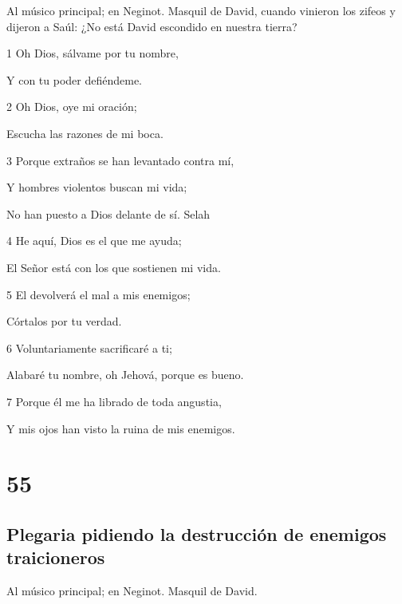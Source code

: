 \par Al músico principal; en Neginot. Masquil de David, cuando vinieron los zifeos y dijeron a Saúl: ¿No está David escondido en nuestra tierra?

\par 1 Oh Dios, sálvame por tu nombre,
\par Y con tu poder defiéndeme.
\par 2 Oh Dios, oye mi oración;
\par Escucha las razones de mi boca.
\par 3 Porque extraños se han levantado contra mí,
\par Y hombres violentos buscan mi vida;
\par No han puesto a Dios delante de sí. Selah
\par 4 He aquí, Dios es el que me ayuda;
\par El Señor está con los que sostienen mi vida.
\par 5 El devolverá el mal a mis enemigos;
\par Córtalos por tu verdad.
\par 6 Voluntariamente sacrificaré a ti;
\par Alabaré tu nombre, oh Jehová, porque es bueno.
\par 7 Porque él me ha librado de toda angustia,
\par Y mis ojos han visto la ruina de mis enemigos.

\chapter{55}

\section*{Plegaria pidiendo la destrucción de enemigos traicioneros}

\par Al músico principal; en Neginot. Masquil de David.

